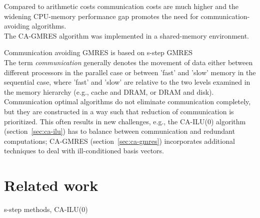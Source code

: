 \documentclass{scrartcl}
\numberwithin{equation}{section}
\begin{document}
Compared to arithmetic costs communication costs are much higher and the widening CPU-memory performance gap promotes the need for communication-avoiding algorithms.\\

The CA-GMRES algorithm was implemented in a shared-memory environment.

Communication avoiding GMRES is based on s-step GMRES 
\cite{Erhel95aparallel}
\\

The term \textit{communication} generally denotes the movement of data either between different processors in the parallel case or between 'fast' and 'slow' memory in the sequential case, where 'fast' and 'slow' are relative to the two levels examined in the memory hierarchy (e.g., cache and DRAM, or DRAM and disk). Communication optimal algorithms do not eliminate communication completely, but they are constructed in a way such that reduction of communication is prioritized. This often results in new challenges, e.g., the  CA-ILU(0) algorithm (section~\ref{sec:ca-ilu}) has to balance between communication and redundant computations; CA-GMRES (section~\ref{sec:ca-gmres}) incorporates additional techniques to deal with ill-conditioned basis vectors.

\section{Related work}
s-step methods, CA-ILU(0)
\end{document}
